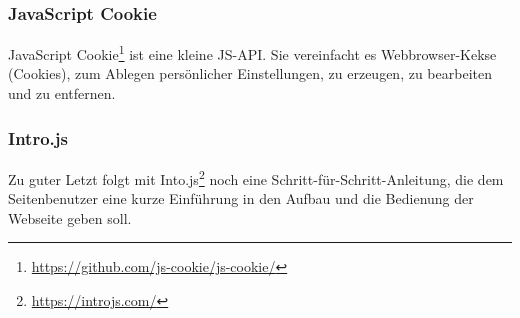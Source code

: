 \subsubsection{JavaScript Cookie}
JavaScript Cookie\footnote{\url{https://github.com/js-cookie/js-cookie/}} ist eine kleine \acl{JS}-\ac{API}.
Sie vereinfacht es Webbrowser-Kekse (Cookies), zum Ablegen persönlicher Einstellungen, zu erzeugen, zu bearbeiten und zu entfernen.

\subsubsection{Intro.js}
Zu guter Letzt folgt mit Into.js\footnote{\url{https://introjs.com/}} noch eine Schritt-für-Schritt-Anleitung, die dem Seitenbenutzer eine kurze Einführung in den Aufbau und die Bedienung der Webseite geben soll.
